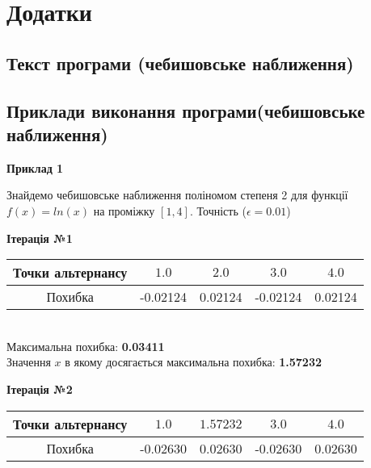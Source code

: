 \documentclass[ukrainian,14pt]{extarticle}
\begin{document}
\newpage

\section{Додатки}

\subsection{Текст програми (чебишовське наближення)}


\newpage

\subsection{Приклади виконання програми(чебишовське наближення)}
\textbf{Приклад 1} 	

Знайдемо чебишовське наближення поліномом степеня 2 для функції $f(x) = ln(x)$ на проміжку $[1, 4]$. Точність ($\epsilon = 0.01$)

\begin{center}
\textbf{Ітерація №1}
\end{center}


\begin{tabular}{|c|c|c|c|c|}
\hline
\rule{0pt}{4ex}
Точки альтернансу & $1.0$ & $2.0$ & $3.0$ & $4.0$ \\ \hline
\rule{0pt}{4ex} 
Похибка & -0.02124 & 0.02124 & -0.02124 & 0.02124  \\ \hline 
\end{tabular}\\

\noindent
Максимальна похибка: \textbf{0.03411}\\
Значення $x$ в якому досягається максимальна похибка: \textbf{1.57232}


\newpage

\begin{center}
\textbf{Ітерація №2}
\end{center}

\begin{tabular}{|c|c|c|c|c|}
\hline
\rule{0pt}{4ex} 
Точки альтернансу & $1.0$ & $1.57232$ & $3.0$ & $4.0$ \\ \hline
\rule{0pt}{4ex} 
Похибка & -0.02630 & 0.02630 & -0.02630 & 0.02630   \\ \hline 
\end{tabular}\\
\end{document}
